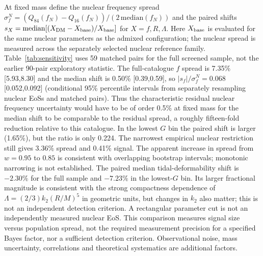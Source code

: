 \documentclass[11pt,a4paper]{article}
\begin{document}
At fixed mass define the nuclear frequency spread $\sigma^N_f=(Q_{84}(f_N)-Q_{16}(f_N))/(2\,\mathrm{median}(f_N))$ and the paired shifts $s_X=\mathrm{median}[(X_{\rm DM}-X_{\rm base})/X_{\rm base}]$ for $X=f,R,\Lambda$. Here $X_{\rm base}$ is evaluated for the same nuclear parameters as the admixed configuration; the nuclear spread is measured across the separately selected nuclear reference family. Table~\ref{tab:sensitivity} uses 59 matched pairs for the full screened sample, not the earlier 90-pair exploratory statistic. The full-catalogue $f$ spread is 7.35\% [5.93,8.30] and the median shift is 0.50\% [0.39,0.59], so $|s_f|/\sigma^N_f=0.068$ [0.052,0.092] (conditional 95\% percentile intervals from separately resampling nuclear EoSs and matched pairs). Thus the characteristic residual nuclear frequency uncertainty would have to be of order 0.5\% at fixed mass for the median shift to be comparable to the residual spread, a roughly fifteen-fold reduction relative to this catalogue. In the lowest $G$ bin the paired shift is larger (1.65\%), but the ratio is only 0.224. The narrowest empirical nuclear restriction still gives 3.36\% spread and 0.41\% signal. The apparent increase in spread from $w=0.95$ to $0.85$ is consistent with overlapping bootstrap intervals; monotonic narrowing is not established. The paired median tidal-deformability shift is $-2.30\%$ for the full sample and $-7.23\%$ in the lowest-$G$ bin. Its larger fractional magnitude is consistent with the strong compactness dependence of $\Lambda=(2/3)k_2(R/M)^5$ in geometric units, but changes in $k_2$ also matter; this is not an independent detection criterion. A rectangular parameter cut is not an independently measured nuclear EoS. This comparison measures signal size versus population spread, not the required measurement precision for a specified Bayes factor, nor a sufficient detection criterion. Observational noise, mass uncertainty, correlations and theoretical systematics are additional factors.
\end{document}
